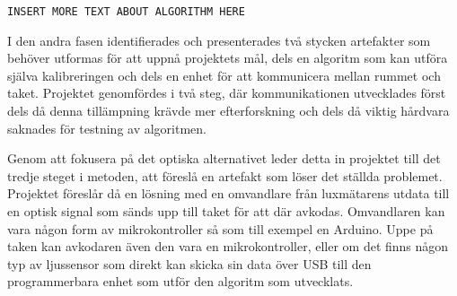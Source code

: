     \texttt{INSERT MORE TEXT ABOUT ALGORITHM HERE} \bigskip

    I den andra fasen identifierades och presenterades två stycken artefakter som behöver utformas för att uppnå projektets mål, dels en algoritm som kan utföra själva kalibreringen och dels en enhet för att kommunicera mellan rummet och taket. Projektet genomfördes i två steg, där kommunikationen 
    utvecklades först dels då denna tillämpning krävde mer efterforskning och dels då viktig hårdvara saknades för testning av algoritmen. \bigskip

    Genom att fokusera på det optiska alternativet leder detta in projektet till det tredje steget i metoden, att föreslå en artefakt som löser det ställda problemet. Projektet föreslår då en lösning med en omvandlare från luxmätarens utdata till en optisk signal som sänds upp till taket för att där avkodas. Omvandlaren kan vara någon form av mikrokontroller så som till exempel en Arduino. Uppe på taken kan avkodaren även den vara en mikrokontroller, eller om det finns någon typ av ljussensor som direkt kan skicka sin data över USB till den programmerbara enhet som utför den algoritm som utvecklats.

